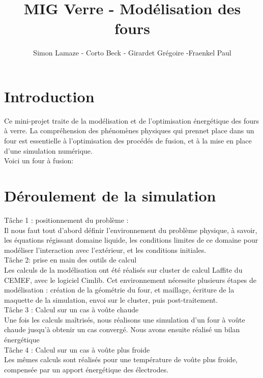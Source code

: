 \documentclass[12pt, a4paper, french, BCOR = 0pt, DIV = 10]{scrartcl}
\title{MIG Verre - Modélisation des fours}
\author{\small{Simon Lamaze - Corto Beck - Girardet Grégoire -Fraenkel Paul}}
\begin{document}
	
	\maketitle
	
	\section{Introduction}
	\raggedright
	Ce mini-projet traite de la modélisation et de l'optimisation énergétique des fours à verre.  La compréhension des phénomènes physiques qui prennet place dans un four est essentielle à l'optimisation des procédés de fusion, et à la mise en place d'une simulation numérique. \\ [0.5 cm]
	Voici un four à fusion:
	

	
	
	
	
	\section{ Déroulement de la simulation}
	\raggedright
	Tâche 1 : positionnement du problème : \\
	Il nous faut tout d'abord définir l'environnement du problème physique, à savoir, les équations régissant domaine liquide, les conditions limites de ce domaine pour modéliser l'interaction avec l'extérieur, et les conditions initiales. \\[0.3 cm]
	
    Tâche 2: prise en main des outils de calcul\\
	Les calculs de la modélisation ont été réalisés sur cluster de calcul Laffite du CEMEF, avec le logiciel Cimlib. Cet environnement nécessite plusieurs étapes de modélisation : création de la géométrie du four, et maillage, écriture de la maquette de la simulation, envoi sur le cluster, puis post-traitement.\\ [0.3 cm]
	
	Tâche 3 : Calcul sur un cas à voûte chaude\\ 
	Une fois les calculs maîtrisés, nous réalisons une simulation d'un four à voûte chaude jusqu'à obtenir un cas convergé. Nous avons ensuite réalisé un bilan énergétique \\ [0.3 cm]
	
	Tâche 4 : Calcul sur un cas à voûte plus froide \\ 
    Les mêmes calculs sont réalisés pour une température de voûte plus froide, compensée par un apport énergétique des électrodes.\\ [0.3 cm]
	
\end{document}
